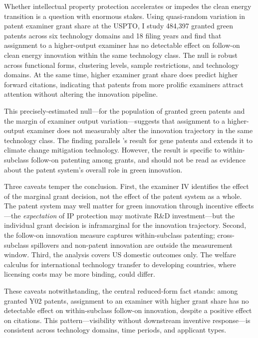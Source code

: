 \documentclass[12pt]{article}
\begin{document}
Whether intellectual property protection accelerates or impedes the clean energy transition is a question with enormous stakes. Using quasi-random variation in patent examiner grant share at the USPTO, I study 484,397 granted green patents across six technology domains and 18 filing years and find that assignment to a higher-output examiner has no detectable effect on follow-on clean energy innovation within the same technology class. The null is robust across functional forms, clustering levels, sample restrictions, and technology domains. At the same time, higher examiner grant share does predict higher forward citations, indicating that patents from more prolific examiners attract attention without altering the innovation pipeline.

This precisely-estimated null---for the population of granted green patents and the margin of examiner output variation---suggests that assignment to a higher-output examiner does not measurably alter the innovation trajectory in the same technology class. The finding parallels \citet{sampat2019}'s result for gene patents and extends it to climate change mitigation technology. However, the result is specific to within-subclass follow-on patenting among grants, and should not be read as evidence about the patent system's overall role in green innovation.

Three caveats temper the conclusion. First, the examiner IV identifies the effect of the marginal grant decision, not the effect of the patent system as a whole. The patent system may well matter for green innovation through incentive effects---the \emph{expectation} of IP protection may motivate R\&D investment---but the individual grant decision is inframarginal for the innovation trajectory. Second, the follow-on innovation measure captures within-subclass patenting; cross-subclass spillovers and non-patent innovation are outside the measurement window. Third, the analysis covers US domestic outcomes only. The welfare calculus for international technology transfer to developing countries, where licensing costs may be more binding, could differ.

These caveats notwithstanding, the central reduced-form fact stands: among granted Y02 patents, assignment to an examiner with higher grant share has no detectable effect on within-subclass follow-on innovation, despite a positive effect on citations. This pattern---visibility without downstream inventive response---is consistent across technology domains, time periods, and applicant types.
\end{document}
